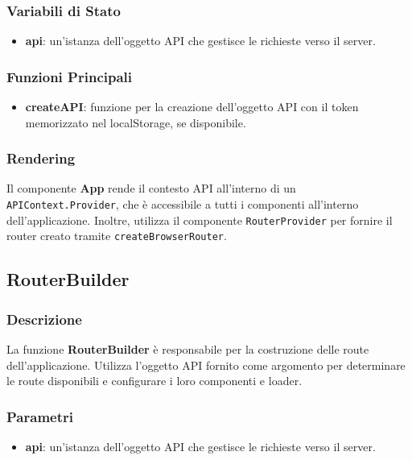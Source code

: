\documentclass{article}
\begin{document}
\subsubsection*{Variabili di Stato}
\begin{itemize}
    \item \textbf{api}: un'istanza dell'oggetto API che gestisce le richieste verso il server.
\end{itemize}

\subsubsection*{Funzioni Principali}
\begin{itemize}
    \item \textbf{createAPI}: funzione per la creazione dell'oggetto API con il token memorizzato nel localStorage, se disponibile.
\end{itemize}

\subsubsection*{Rendering}
Il componente \textbf{App} rende il contesto API all'interno di un \texttt{APIContext.Provider}, che è accessibile a tutti i componenti all'interno dell'applicazione. Inoltre, utilizza il componente \texttt{RouterProvider} per fornire il router creato tramite \texttt{createBrowserRouter}.

\subsection*{RouterBuilder}

\subsubsection*{Descrizione}
La funzione \textbf{RouterBuilder} è responsabile per la costruzione delle route dell'applicazione. Utilizza l'oggetto API fornito come argomento per determinare le route disponibili e configurare i loro componenti e loader.

\subsubsection*{Parametri}
\begin{itemize}
    \item \textbf{api}: un'istanza dell'oggetto API che gestisce le richieste verso il server.
\end{itemize}
\end{document}
